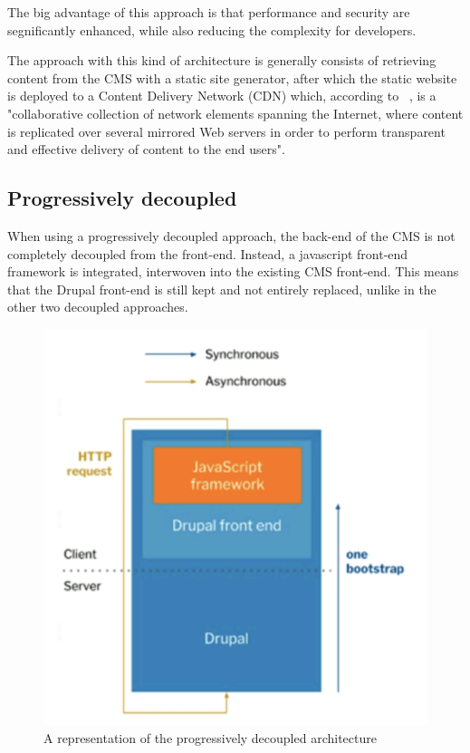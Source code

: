 The big advantage of this approach is that performance and security are segnificantly enhanced, while also reducing the complexity for developers.

The approach with this kind of architecture is generally consists of retrieving content from the CMS with a static site generator, after which the static website is deployed to a Content Delivery Network (CDN) which, according to ~\textcite{Buyya2008}, is a "collaborative collection of network elements spanning the Internet, where content is replicated over
several mirrored Web servers in order to perform transparent and effective delivery of content to the end users".


\subsection{Progressively decoupled}

When using a progressively decoupled approach, the back-end of the CMS is not completely decoupled from the front-end. Instead, a javascript front-end framework is integrated, interwoven into the existing CMS front-end. This means that the Drupal front-end is still kept and not entirely replaced, unlike in the other two decoupled approaches. 

\begin{figure}
	\centering
	\includegraphics{./img/Progressively_Decoupled.png}
	\caption[Progressively decoupled CMS architecture]{A representation of the progressively decoupled architecture ~\autocite{So2018}}
\end{figure}

